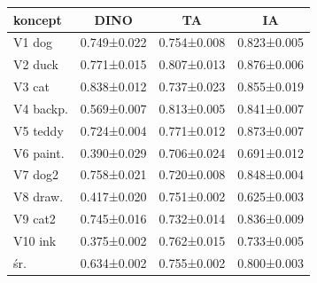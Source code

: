 \begin{tabular}{lccc}
\toprule
koncept & DINO & TA & IA \\
\midrule
V1 dog & 0.749±0.022 & 0.754±0.008 & 0.823±0.005 \\
V2 duck & 0.771±0.015 & 0.807±0.013 & 0.876±0.006 \\
V3 cat & 0.838±0.012 & 0.737±0.023 & 0.855±0.019 \\
V4 backp. & 0.569±0.007 & 0.813±0.005 & 0.841±0.007 \\
V5 teddy & 0.724±0.004 & 0.771±0.012 & 0.873±0.007 \\
V6 paint. & 0.390±0.029 & 0.706±0.024 & 0.691±0.012 \\
V7 dog2 & 0.758±0.021 & 0.720±0.008 & 0.848±0.004 \\
V8 draw. & 0.417±0.020 & 0.751±0.002 & 0.625±0.003 \\
V9 cat2 & 0.745±0.016 & 0.732±0.014 & 0.836±0.009 \\
V10 ink & 0.375±0.002 & 0.762±0.015 & 0.733±0.005 \\
\midrule
śr. & 0.634±0.002 & 0.755±0.002 & 0.800±0.003 \\
\bottomrule
\end{tabular}
